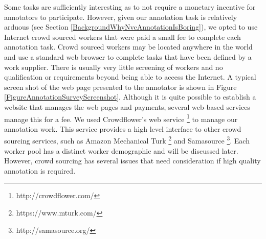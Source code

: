 Some tasks are sufficiently interesting as to not require a monetary incentive for annotators to participate. However, given our annotation task is relatively arduous (see Section \ref{BackgroundWhyNvcAnnotationIsBoring}), we opted to use Internet crowd sourced workers that were paid a small fee to complete each annotation task. Crowd sourced workers may be located anywhere in the world and use a standard web browser to complete tasks that have been defined by a work supplier. There is usually very little screening of workers and no qualification or requirements beyond being able to access the Internet. A typical screen shot of the web page presented to the annotator is shown in Figure \ref{FigureAnnotationSurveyScreenshot}. Although it is quite possible to establish a website that manages the web pages and payments, several web-based services manage this for a fee. We used Crowdflower's web service \footnote{\scriptsize{http://crowdflower.com/}} to manage our annotation work. This service provides a high level interface to other crowd sourcing services, such as Amazon Mechanical Turk \footnote{\scriptsize{https://www.mturk.com/}} and Samasource \footnote{\scriptsize{http://samasource.org/}}. Each worker pool has a distinct worker demographic and will be discussed later. However, crowd sourcing has several issues that need consideration if high quality annotation is required.

